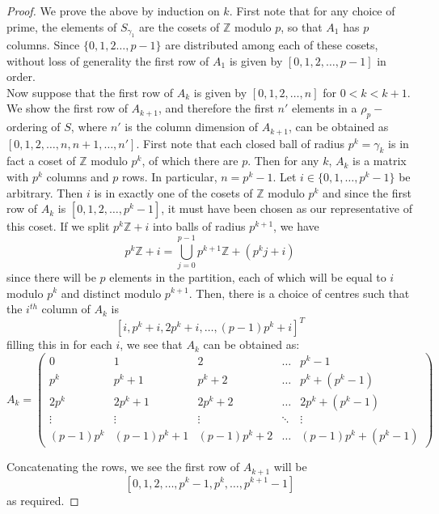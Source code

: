 \begin{proof}
We prove the above by induction on $k$. First note that for any choice of prime, the elements of $S_{\gamma_1}$ are the cosets of $\mathbb{Z}$ modulo $p$, so that $A_1$ has $p$ columns. Since $\{0,1,2\ldots,p-1\}$ are distributed among each of these cosets, without loss of generality the first row of $A_1$ is given by $[0,1,2,\ldots, p-1]$ in order.\\

Now suppose that the first row of $A_k$ is given by $[0,1,2,\ldots,n]$ for $0 < k < k+1$. We show the first row of $A_{k+1}$, and therefore the first $n'$ elements in a $\rho_p-$ordering of $S$, where $n'$ is the column dimension of $A_{k+1}$, can be obtained as $[0,1,2,\ldots,n,n+1,\ldots,n']$. First note that each closed ball of radius $p^k = \gamma_k$ is in fact a coset of $\mathbb{Z}$ modulo $p^k$, of which there are $p$. Then for any $k$, $A_k$ is a matrix with $p^k$ columns and $p$ rows. In particular, $n=p^k-1$. Let $i \in \{0,1,\ldots,p^{k}-1\}$ be arbitrary. Then $i$ is in exactly one of the cosets of $\mathbb{Z}$ modulo $p^k$ and since the first row of $A_k$ is $[0,1,2,\ldots,p^k-1]$, it must have been chosen as our representative of this coset. If we split $p^k\mathbb{Z}+i$ into balls of radius $p^{k+1}$, we have \[p^k\mathbb{Z}+i = \bigcup_{j=0}^{p-1} p^{k+1}\mathbb{Z} + (p^kj + i) \]
since there will be $p$ elements in the partition, each of which will be equal to $i$ modulo $p^k$ and distinct modulo $p^{k+1}$. Then, there is a choice of centres such that the $i^{th}$ column of $A_{k}$ is \[[i,p^k +i, 2p^k +i,\ldots, (p-1)p^k +i]^T\]
filling this in for each $i$, we see that $A_k$ can be obtained as:
\[A_k=
 \begin{pmatrix}
0 & 1 &  2 & \ldots & p^k -1 \\
p^k & p^k+1 &  p^k+2 & \ldots & p^k+(p^k-1) \\
2p^k & 2p^k+1 &  2p^k+2 & \ldots & 2p^k+(p^k-1) \\
\vdots &  \vdots & \vdots & \ddots & \vdots \\
(p-1)p^k & (p-1)p^k +1 &  (p-1)p^k+2 & \ldots & (p-1)p^k+(p^k-1)
\end{pmatrix}
\]

Concatenating the rows, we see the first row of $A_{k+1}$ will be \[[0,1,2,\ldots,p^k-1,p^k,\ldots,p^{k+1}-1]\] as required. 
\end{proof}

